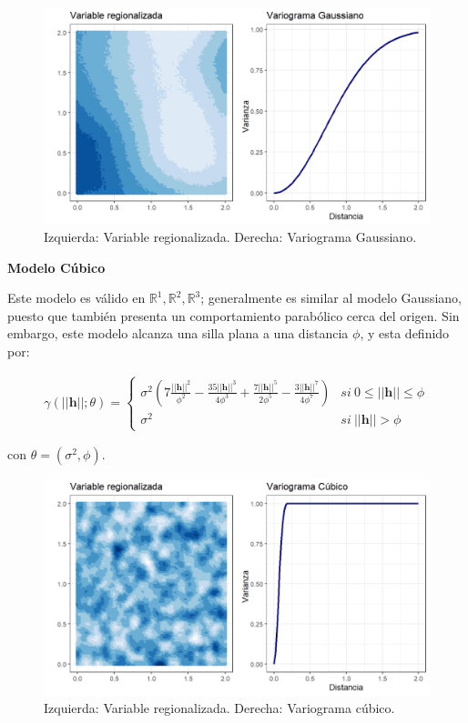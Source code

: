 \documentclass[
]{book}
\begin{document}
\begin{figure}
\includegraphics[width=17.78in]{figuras/otros/gau_var} \caption{Izquierda: Variable regionalizada. Derecha: Variograma Gaussiano.}\label{fig:gauvar}
\end{figure}

\textbf{Modelo Cúbico}

Este modelo es válido en \(\mathbb{R}^1,\mathbb{R}^2,\mathbb{R}^3\); generalmente es similar al modelo Gaussiano, puesto que también presenta un comportamiento parabólico cerca del origen. Sin embargo, este modelo alcanza una silla plana a una distancia \(\phi\), y esta definido por:

\begin{align}
    \gamma(||\textbf{h}||;\theta)=\left \{ \begin{matrix} \sigma^2\left(7\frac{||\textbf{h}||^2}{\phi^2}-\frac{35||\textbf{h}||^3}{4\phi^3}+\frac{7||\textbf{h}||^5}{2\phi^5}-\frac{3||\textbf{h}||^7}{4\phi^7} \right) &  si \ 0\leq||\textbf{h}||\leq\phi\\
    \sigma^2 &  si\ ||\textbf{h}||>\phi \end{matrix}\right.
\end{align}

con \(\theta=(\sigma^2,\phi)\).

\begin{figure}
\includegraphics[width=17.78in]{figuras/otros/cub_var} \caption{Izquierda: Variable regionalizada. Derecha: Variograma cúbico.}\label{fig:cubvar}
\end{figure}
\end{document}
